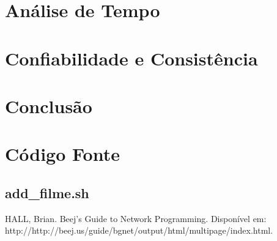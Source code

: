 \documentclass[11pt,twoside]{article}
\begin{document}
\section{Análise de Tempo}
\section{Confiabilidade e Consistência}
\section{Conclusão}

\section{Código Fonte}
\subsection{add\_filme.sh}

\begin{thebibliography}{99}
 HALL, Brian. Beej's Guide to Network Programming. Disponível em: http://http://beej.us/guide/bgnet/output/html/multipage/index.html.
\end{thebibliography}
\end{document}
